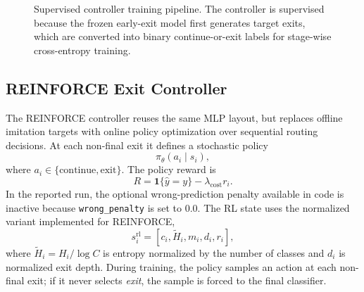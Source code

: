 \documentclass[10pt,twocolumn]{article}
\begin{document}
\begin{figure}[!tbp]
    \centering
    \caption{Supervised controller training pipeline. The controller is supervised because the frozen early-exit model first generates target exits, which are converted into binary continue-or-exit labels for stage-wise cross-entropy training.}
    \label{fig:supervised-labels}
\end{figure}

\subsection{REINFORCE Exit Controller}

The REINFORCE controller reuses the same MLP layout, but replaces offline imitation targets with online policy optimization over sequential routing decisions. At each non-final exit it defines a stochastic policy
\begin{equation}
    \pi_\theta(a_i \mid s_i),
\end{equation}
where $a_i \in \{\text{continue}, \text{exit}\}$. The policy reward is
\begin{equation}
    R =
    \mathbf{1}\{\hat{y}=y\}
    -
    \lambda_{\text{cost}} r_i.
\end{equation}
In the reported run, the optional wrong-prediction penalty available in code is inactive because \texttt{wrong\_penalty} is set to $0.0$. The RL state uses the normalized variant implemented for REINFORCE,
\begin{equation}
    s_i^{\text{rl}} = [c_i, \tilde{H}_i, m_i, d_i, r_i],
\end{equation}
where $\tilde{H}_i = H_i / \log C$ is entropy normalized by the number of classes and $d_i$ is normalized exit depth. During training, the policy samples an action at each non-final exit; if it never selects \emph{exit}, the sample is forced to the final classifier.
\end{document}
